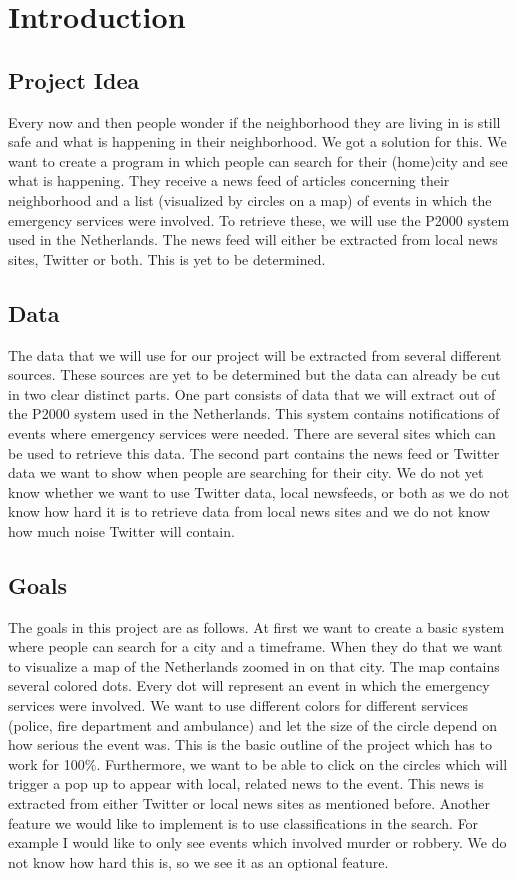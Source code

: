 \section{Introduction}
\subsection*{Project Idea}
Every now and then people wonder if the neighborhood they are living in is still safe and what is happening in their neighborhood. 
We got a solution for this. We want to create a program in which people can search for their (home)city and see what is happening. They receive a news feed of articles concerning their neighborhood and a list (visualized by circles on a map) of events in which the emergency services were involved. To retrieve these, we will use the P2000 system used in the Netherlands. The news feed will either be extracted from local news sites, Twitter or both. This is yet to be determined. 

\subsection*{Data}
The data that we will use for our project will be extracted from several different sources. These sources are yet to be determined but the data can already be cut in two clear distinct parts. One part consists of data that we will extract out of the P2000 system used in the Netherlands. This system contains notifications of events where emergency services were needed. There are several sites which can be used to retrieve this data. 
The second part contains the news feed or Twitter data we want to show when people are searching for their city. We do not yet know whether we want to use Twitter data, local newsfeeds, or both as we do not know how hard it is to retrieve data from local news sites and we do not know how much noise Twitter will contain.
\subsection*{Goals}
The goals in this project are as follows. At first we want to create a basic system where people can search for a city and a timeframe. When they do that we want to visualize a map of the Netherlands zoomed in on that city. The map contains several colored dots. Every dot will represent an event in which the emergency services were involved. We want to use different colors for different services (police, fire department and ambulance) and let the size of the circle depend on how serious the event was. This is the basic outline of the project which has to work for 100$\%$. Furthermore, we want to be able to click on the circles which will trigger a pop up to appear with local, related news to the event. This news is extracted from either Twitter or local news sites as mentioned before. Another feature we would like to implement is to use classifications in the search. For example I would like to only see events which involved murder or robbery. We do not know how hard this is, so we see it as an optional feature.
